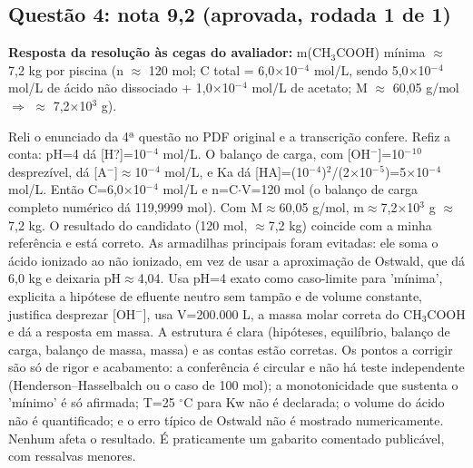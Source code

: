 \documentclass{article}%
\begin{document}
\subsection*{Questão 4: nota 9,2 (aprovada, rodada 1 de 1)}%
\textbf{Resposta da resolução às cegas do avaliador:} m(CH$_{3}$COOH) mínima $\approx$ 7,2 kg por piscina (n $\approx$ 120 mol; C total = 6,0$\times$10$^{-}$$^{4}$ mol/L, sendo 5,0$\times$10$^{-}$$^{4}$ mol/L de ácido não dissociado + 1,0$\times$10$^{-}$$^{4}$ mol/L de acetato; M $\approx$ 60,05 g/mol $\Rightarrow$ $\approx$ 7,2$\times$10$^3$ g).\par %
Reli o enunciado da 4ª questão no PDF original e a transcrição confere. Refiz a conta: pH=4 dá {[}H?{]}=10$^{-}$$^{4}$ mol/L. O balanço de carga, com {[}OH$^{-}${]}=10$^{-}$$^{1}$$^{0}$ desprezível, dá {[}A$^{-}${]}$\approx$10$^{-}$$^{4}$ mol/L, e Ka dá {[}HA{]}=(10$^{-}$$^{4}$)$^2$/(2$\times$10$^{-}$$^{5}$)=5$\times$10$^{-}$$^{4}$ mol/L. Então C=6,0$\times$10$^{-}$$^{4}$ mol/L e n=C$\cdot$V=120 mol (o balanço de carga completo numérico dá 119,9999 mol). Com M$\approx$60,05 g/mol, m$\approx$7,2$\times$10$^3$ g $\approx$ 7,2 kg. O resultado do candidato (120 mol, $\approx$7,2 kg) coincide com a minha referência e está correto. As armadilhas principais foram evitadas: ele soma o ácido ionizado ao não ionizado, em vez de usar a aproximação de Ostwald, que dá 6,0 kg e deixaria pH$\approx$4,04. Usa pH=4 exato como caso{-}limite para 'mínima', explicita a hipótese de efluente neutro sem tampão e de volume constante, justifica desprezar {[}OH$^{-}${]}, usa V=200.000 L, a massa molar correta do CH$_{3}$COOH e dá a resposta em massa. A estrutura é clara (hipóteses, equilíbrio, balanço de carga, balanço de massa, massa) e as contas estão corretas. Os pontos a corrigir são só de rigor e acabamento: a conferência é circular e não há teste independente (Henderson--Hasselbalch ou o caso de 100 mol); a monotonicidade que sustenta o 'mínimo' é só afirmada; T=25 $^\circ$C para Kw não é declarada; o volume do ácido não é quantificado; e o erro típico de Ostwald não é mostrado numericamente. Nenhum afeta o resultado. É praticamente um gabarito comentado publicável, com ressalvas menores.%
$$
\end{document}
